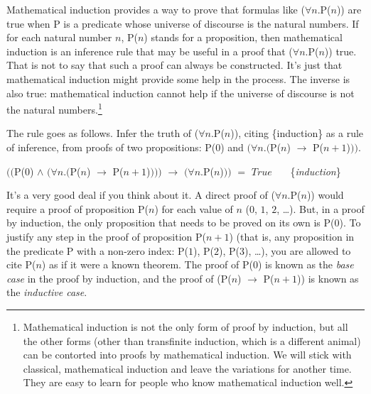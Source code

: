 Mathematical induction
provides a way to prove that
formulas like ($\forall$$n$.P($n$)) are true
when P is a predicate whose universe of discourse is the natural numbers.
If for each natural number $n$, P($n$) stands for a proposition,
then mathematical induction is an inference rule that may be useful
in a proof that ($\forall$$n$.P($n$)) true.
That is not to say that such a proof can always be constructed.
It's just that mathematical induction might provide some help in the process.
The inverse is also true: mathematical induction cannot help
if the universe of discourse is not the natural numbers.\footnote{Mathematical
induction is not the only form
of proof by induction, but all the other forms
(other than transfinite induction, which is a different animal)
can be contorted into proofs by mathematical induction.
We will stick with classical, mathematical induction
and leave the variations for another time.
They are easy to learn for people who know mathematical induction well.}

The rule goes as follows. Infer the truth of ($\forall$$n$.P($n$)),
citing \{induction\} as a rule of inference,
from proofs of two propositions:
P(0) and $(\forall n.($P($n$) $\rightarrow$ P($n+1$)$))$.
\begin{center}
$(($P($0$) $\wedge$ $(\forall n.($P($n$) $\rightarrow$ P($n+1$)$)))$ $\rightarrow$ $(\forall n.$P($n$)$))$ $=$ $True$
~~~\{\emph{induction}\}
\end{center}

It's a very good deal if you think about it.
A direct proof of ($\forall$$n$.P($n$)) would require a proof of proposition P($n$)
for each value of $n$ ($0$, $1$, $2$, \dots).
But, in a proof by induction,
the only proposition that needs to be proved on its own is P($0$).
To justify any step in the proof of proposition P($n+1$)
(that is, any proposition in the predicate P with a non-zero index:
P($1$), P($2$), P($3$), \dots),
you are allowed to cite P($n$) as if it were a known theorem.
The proof of P($0$) is known as the
\emph{base case}
in the proof by induction,
and the proof of (P($n$) $\rightarrow$ P($n+1$)) is known as the
\emph{inductive case}.

